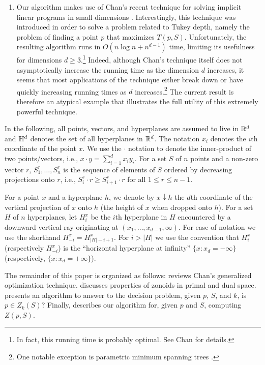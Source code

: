 \documentclass[lotsofwhite]{patmorin}
\newcommand{\drop}{\!\!\downarrow\!\!}
\begin{document}
\begin{enumerate}
\item Our algorithm makes use of Chan's recent technique for solving
implicit linear programs in small dimensions \cite{c04}.  Interestingly,
this technique was introduced in order to solve a problem related to
Tukey depth, namely the problem of finding a point $p$ that maximizes
$T(p,S)$.  Unfortunately, the resulting algorithm runs in $O(n\log n +
n^{d-1})$ time, limiting its usefulness for dimensions $d\ge
3$.\footnote{In fact, this running time is probably optimal. See Chan
\cite[Section 1.4]{c04} for details.}  Indeed, although Chan's
technique itself does not asymptotically increase the running time as
the dimension $d$ increases, it seems that most applications of the
technique either break down or have quickly increasing running times
as $d$ increases.\footnote{One notable exception is parametric minimum
spanning trees \cite{e03}.}  The current result is therefore an
atypical example that illustrates the full utility of this extremely
powerful technique.
\end{enumerate}

In the following, all points, vectors, and hyperplanes are assumed to
live in $\mathbb{R}^d$ and $\mathbb{H}^d$ denotes the set of all hyperplanes in
$\mathbb{R}^d$.  The notation $x_i$ denotes the $i$th coordinate of the point
$x$.  We use the $\cdot$ notation to denote the inner-product of two
points/vectors, i.e., $x\cdot y=\sum_{i=1}^d x_iy_i$.  For a set $S$
of $n$ points and a non-zero vector $r$, $S_1^r,\ldots,S_n^r$ is the
sequence of elements of $S$ ordered by decreasing projections onto
$r$, i.e., $S_i^r\cdot r \ge S_{i+1}^r\cdot r$ for all $1\le r\le
n-1$.

For a point $x$ and a hyperplane $h$, we denote by $x\drop h$ the
$d$th coordinate of the vertical projection of $x$ onto $h$ (the
height of $x$ when dropped onto $h$).  For a set $H$ of $n$
hyperplanes, let $H_i^x$ be the $i$th hyperplane in $H$ encountered by
a downward vertical ray originating at $(x_1,\ldots,x_{d-1},\infty)$.
For ease of notation we use the shorthand $H_{-i}^x=H_{|H|-i+1}^x$.
For $i>|H|$ we use the convention that $H_{i}^x$ (respectively
$H_{-i}^x$) is the ``horizontal hyperplane at infinity''
$\{x:x_d=-\infty\}$ (respectively, $\{x:x_d=+\infty\}$). 

The remainder of this paper is organized as follows: 
reviews Chan's generalized optimization technique.  
discusses properties of zonoids in primal and dual space.
 presents an algorithm to answer to the decision
problem, given $p$, $S$, and $k$, is $p\in Z_k(S)$?  Finally,
 describes our algorithm for, given $p$ and $S$,
computing $Z(p,S)$.
 
\end{document}
